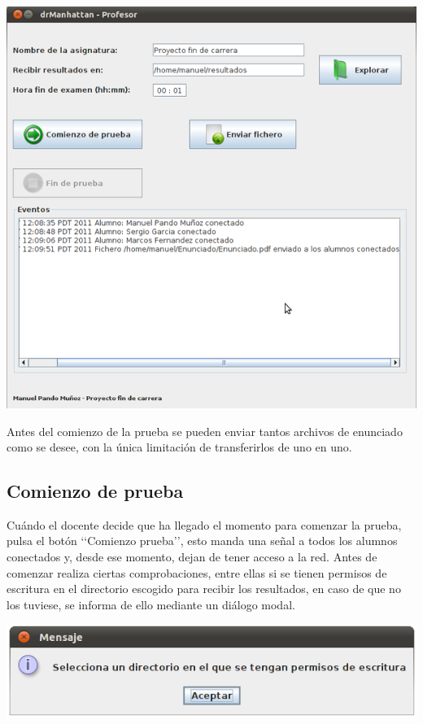 \documentclass[11pt]{article}
\begin{document}
\begin{center}
    \includegraphics[width=.90\linewidth]{imagenes/eventoEnviar}
\end{center}

Antes del comienzo de la prueba se pueden enviar tantos archivos de enunciado como se desee, con la única limitación de transferirlos de uno en uno.

\subsection{Comienzo de prueba}

Cuándo el docente decide que ha llegado el momento para comenzar la prueba, pulsa el botón \lq\lq Comienzo prueba\rq\rq, esto manda una señal a todos los alumnos conectados y, desde ese momento, dejan de tener acceso a la red.
Antes de comenzar realiza ciertas comprobaciones, entre ellas si se tienen permisos de escritura en el directorio escogido para recibir los resultados, en caso de que no los tuviese, se informa de ello mediante un diálogo modal.

\begin{center}
    \includegraphics[width=.90\linewidth]{imagenes/comienzoPermisos}
\end{center}
\end{document}
